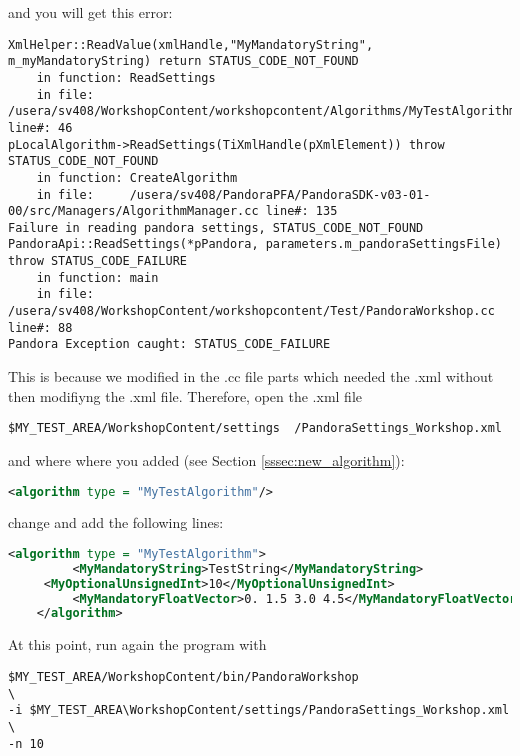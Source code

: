 and you will get this error:

\begin{lstlisting}[caption=Python example]
XmlHelper::ReadValue(xmlHandle,"MyMandatoryString", m_myMandatoryString) return STATUS_CODE_NOT_FOUND
    in function: ReadSettings
    in file:     /usera/sv408/WorkshopContent/workshopcontent/Algorithms/MyTestAlgorithm.cc line#: 46
pLocalAlgorithm->ReadSettings(TiXmlHandle(pXmlElement)) throw STATUS_CODE_NOT_FOUND
    in function: CreateAlgorithm
    in file:     /usera/sv408/PandoraPFA/PandoraSDK-v03-01-00/src/Managers/AlgorithmManager.cc line#: 135
Failure in reading pandora settings, STATUS_CODE_NOT_FOUND
PandoraApi::ReadSettings(*pPandora, parameters.m_pandoraSettingsFile) throw STATUS_CODE_FAILURE
    in function: main
    in file:     /usera/sv408/WorkshopContent/workshopcontent/Test/PandoraWorkshop.cc line#: 88
Pandora Exception caught: STATUS_CODE_FAILURE
\end{lstlisting}

This is because we modified in the .cc file parts which needed the .xml without then modifiyng the .xml file. Therefore, open the .xml file 

\begin{verbatim}
$MY_TEST_AREA/WorkshopContent/settings	/PandoraSettings_Workshop.xml
\end{verbatim}

and where where you added (see Section \ref{sssec:new_algorithm}):

\begin{lstlisting}[language=XML]
  <algorithm type = "MyTestAlgorithm"/>
\end{lstlisting}

change and add the following lines:

\begin{lstlisting}[language=XML, caption=XML example]
   <algorithm type = "MyTestAlgorithm">
         <MyMandatoryString>TestString</MyMandatoryString>
	 <MyOptionalUnsignedInt>10</MyOptionalUnsignedInt>
         <MyMandatoryFloatVector>0. 1.5 3.0 4.5</MyMandatoryFloatVector>
    </algorithm>
\end{lstlisting}

At this point, run again the program with 
\begin{verbatim}
$MY_TEST_AREA/WorkshopContent/bin/PandoraWorkshop                      \
-i $MY_TEST_AREA\WorkshopContent/settings/PandoraSettings_Workshop.xml \
-n 10
\end{verbatim}

